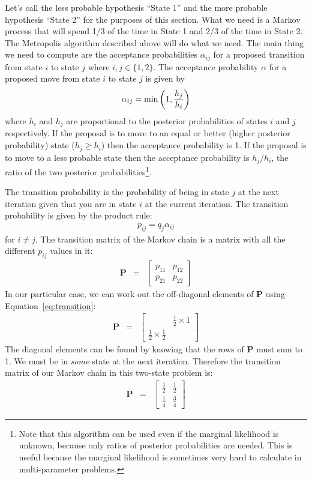 Let's
call the less probable hypothesis ``State 1'' and the more probable hypothesis
``State 2'' for the purposes of this section.
What we need is a Markov process that will spend 1/3 of the time in State 1 and
2/3 of the time in State 2. The Metropolis algorithm described above will
do what we need. The main thing we need to compute are the acceptance probabilities
$\alpha_{ij}$ for a proposed transition from state $i$ to state $j$ where
$i, j \in \{1, 2\}$.
The acceptance probability $\alpha$ for a proposed move from state $i$ to
state $j$ is given by
\begin{eqnarray}
\alpha_{ij} = \textnormal{min}\left(1, \frac{h_j}{h_i}\right)
\end{eqnarray}
where $h_i$ and $h_j$ are proportional to the posterior probabilities of
states $i$ and $j$ respectively. If the proposal is to move
to an equal or better (higher posterior probability)
state ($h_j \geq h_i$) then the acceptance probability is 1.
If the proposal is to move to a less probable state then the acceptance probability
is $h_j/h_i$, the ratio of the two posterior probabilities\footnote{Note that
this algorithm can be used even if the marginal likelihood is unknown, because
only ratios of posterior probabilities are needed. This is useful because the
marginal likelihood is sometimes very hard to calculate in multi-parameter
problems.}.

The transition probability is the probability
of being in state $j$ at the next iteration given that you are in state $i$
at the current iteration. The transition probability is given by the product
rule:
\begin{eqnarray}
p_{ij} = q_j \alpha_{ij}\label{eq:transition}
\end{eqnarray}
for $i \neq j$.
The transition matrix of the Markov chain is a matrix with all the different
$p_{ij}$ values in it:
\begin{eqnarray}
\mathbf{P} &=&
\left[
\begin{array}{cc}
p_{11} & p_{12}\\
p_{21} & p_{22}
\end{array}
\right]
\end{eqnarray}
In our particular case, we can work out the off-diagonal elements of
$\mathbf{P}$ using Equation~\ref{eq:transition}:
\begin{eqnarray}
\mathbf{P}
&=&
\left[
\begin{array}{cc}
 & \frac{1}{2} \times 1\\
\frac{1}{2}\times\frac{1}{2} & 
\end{array}
\right]
\end{eqnarray}
The diagonal elements can be found by knowing that the rows of $\mathbf{P}$ must
sum to 1. We must be in {\it some} state at the next iteration. Therefore the
transition matrix of our Markov chain in this two-state problem is:
\begin{eqnarray}
\mathbf{P}
&=&
\left[
\begin{array}{cc}
\frac{1}{2} & \frac{1}{2}\\
\frac{1}{4} & \frac{3}{4}
\end{array}
\right]\label{eq:p_matrix}
\end{eqnarray}

